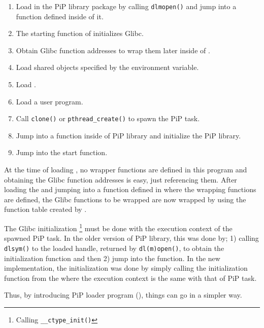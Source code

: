 \begin{enumerate}
\item Load  in the PiP library package by calling
  {\tt dlmopen()} and jump into a function defined inside of it.
\item The starting function of  initializes Glibc.
\item Obtain Glibc function addresses to wrap them later inside of
  .
\item Load shared objects specified by the 
  environment variable.
\item Load . 
\item Load a user program.
\item Call {\tt clone()} or {\tt pthread_create()} to spawn the PiP
  task.
\item Jump into a function inside of PiP library and initialize the
  PiP library. 
\item Jump into the start function.
\end{enumerate}

At the time of loading , no wrapper functions are
defined in this program and obtaining the Glibc function addresses is
easy, just referencing them. After loading the  and
jumping into a function defined in  where the
wrapping functions are defined, the Glibc functions to be wrapped are
now wrapped by using the function table created by
. 

The Glibc initialization \footnote{Calling {\tt __ctype_init()}} must
be done with the execution context of the spawned PiP task. In the
older version of PiP library, this was done by; 1) calling {\tt
  dlsym()} to the loaded handle, returned by {\tt dl(m)open()},
to obtain the initialization function
and then 2) jump into the function. In the new implementation, the
initialization was done by simply calling the initialization function
from the  where the execution context is the same
with that of PiP task. 

Thus, by introducing PiP loader program (), things
can go in a simpler way. 
